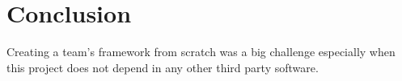 \chapter{Conclusion}
\label{conclusion}

Creating a team's framework from scratch was a big challenge especially when this project does not depend in any other third party software.  
 


